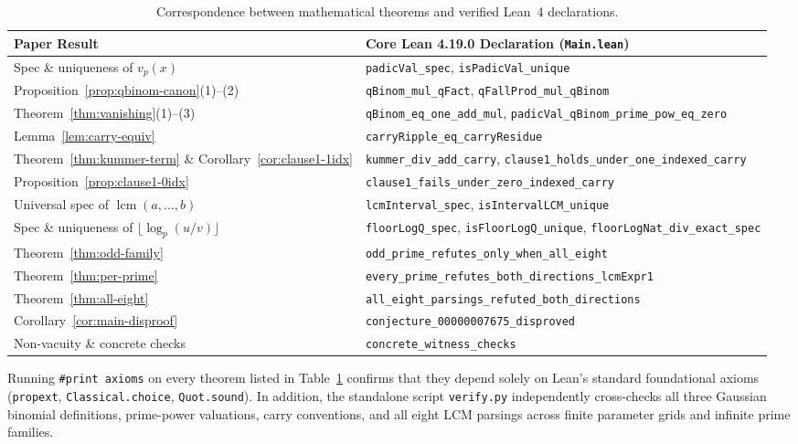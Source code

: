 \documentclass[11pt,a4paper]{article}
\theoremstyle{definition}
\theoremstyle{remark}
\newcommand{\lcm}{\operatorname{lcm}}
\begin{document}
\begin{table}[ht]
\centering
\footnotesize
\setlength{\tabcolsep}{5pt}
\renewcommand{\arraystretch}{1.25}
\begin{tabular}{@{}ll@{}}
\hline
\textbf{Paper Result} & \textbf{Core Lean 4.19.0 Declaration (\texttt{Main.lean})} \\
\hline
Spec \& uniqueness of $v_p(x)$ & \texttt{padicVal\_spec}, \texttt{isPadicVal\_unique} \\
Proposition~\ref{prop:qbinom-canon}(1)--(2) & \texttt{qBinom\_mul\_qFact}, \texttt{qFallProd\_mul\_qBinom} \\
Theorem~\ref{thm:vanishing}(1)--(3) & \texttt{qBinom\_eq\_one\_add\_mul}, \texttt{padicVal\_qBinom\_prime\_pow\_eq\_zero} \\
Lemma~\ref{lem:carry-equiv} & \texttt{carryRipple\_eq\_carryResidue} \\
Theorem~\ref{thm:kummer-term} \& Corollary~\ref{cor:clause1-1idx} & \texttt{kummer\_div\_add\_carry}, \texttt{clause1\_holds\_under\_one\_indexed\_carry} \\
Proposition~\ref{prop:clause1-0idx} & \texttt{clause1\_fails\_under\_zero\_indexed\_carry} \\
Universal spec of $\lcm(a,\dots,b)$ & \texttt{lcmInterval\_spec}, \texttt{isIntervalLCM\_unique} \\
Spec \& uniqueness of $\lfloor \log_p(u/v)\rfloor$ & \texttt{floorLogQ\_spec}, \texttt{isFloorLogQ\_unique}, \texttt{floorLogNat\_div\_exact\_spec} \\
Theorem~\ref{thm:odd-family} & \texttt{odd\_prime\_refutes\_only\_when\_all\_eight} \\
Theorem~\ref{thm:per-prime} & \texttt{every\_prime\_refutes\_both\_directions\_lcmExpr1} \\
Theorem~\ref{thm:all-eight} & \texttt{all\_eight\_parsings\_refuted\_both\_directions} \\
Corollary~\ref{cor:main-disproof} & \texttt{conjecture\_00000007675\_disproved} \\
Non-vacuity \& concrete checks & \texttt{concrete\_witness\_checks} \\
\hline
\end{tabular}
\caption{Correspondence between mathematical theorems and verified Lean~4 declarations.}
\label{tab:lean-map}
\end{table}

\noindent
Running \texttt{\#print axioms} on every theorem listed in Table~\ref{tab:lean-map}
confirms that they depend solely on Lean's standard foundational axioms
(\texttt{propext}, \texttt{Classical.choice}, \texttt{Quot.sound}). In addition, the
standalone script \texttt{verify.py} independently cross-checks all three Gaussian
binomial definitions, prime-power valuations, carry conventions, and all eight LCM
parsings across finite parameter grids and infinite prime families.
\end{document}
